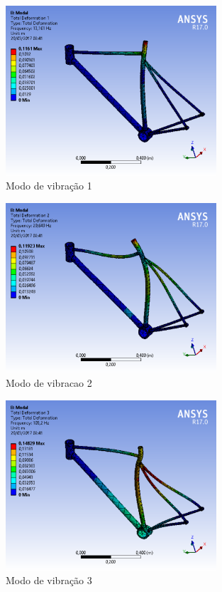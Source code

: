 		\graphicspath{{figuras/}}
			\begin{figure}[h!]
			\centering
			\includegraphics[width=0.7\textwidth]{modo_de_vibracao.png}
			\caption{Modo de vibração 1}
			\label{img:modo_de_vibracao}
			\end{figure}	
			
		\graphicspath{{figuras/}}
			\begin{figure}[h!]
			\centering
			\includegraphics[width=0.7\textwidth]{modo_de_vibracao_2.png}
			\caption{Modo de vibracao 2}
			\label{img:modo_de_vibracao2}
			\end{figure}	
			
		\graphicspath{{figuras/}}
			\begin{figure}[h!]
			\centering
			\includegraphics[width=0.7\textwidth]{modo_de_vibracao_3.png}
			\caption{Modo de vibração 3}
			\label{img:modo_de_vibracao3}
			\end{figure}	
			
